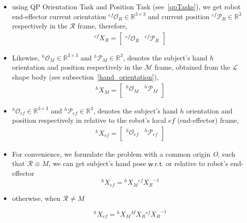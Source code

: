 \begin{itemize}
	\item using QP Orientation Task and Position Task (see~\ref{qpTasks}), we get robot end-effector current orientation ${{}^{ef}\mathcal{O}_R} \in \mathbb{R}^{3\times3}$ and current position ${{}^{ef}\mathcal{P}_R} \in \mathbb{R}^{3}$ respectively in the $\mathcal{R}$ frame, therefore,
	\begin{gather}\label{X_R_ef}
		{}^{ef}{X}_R =
		\left[\begin{array}{cc}
		{}^{ef}\mathcal{O}_R & {}^{ef}\mathcal{P}_R
		\end{array}\right]
	\end{gather}
	
	\item Likewise, ${{}^{h}\mathcal{O}_M} \in \mathbb{R}^{3\times3}$ and ${{}^{h}\mathcal{P}_M} \in \mathbb{R}^{3}$, denotes the subject's hand $h$ orientation and position respectively in the $\mathcal{M}$ frame, obtained from the $\mathcal{L}$ shape body (see subsection~\ref{hand_orientation}),
	\begin{gather}\label{X_M_h}
		{}^{h}{X}_M =
		\left[\begin{array}{cc}
		{}^{h}\mathcal{O}_M & {}^{h}\mathcal{P}_M \\
		\end{array}\right]
	\end{gather}

	\item ${{}^{h}\mathcal{O}_{ef}} \in \mathbb{R}^{3\times3}$ and ${{}^{h}\mathcal{P}_{ef}} \in \mathbb{R}^{3}$, denotes the subject's hand $h$ orientation and position respectively in relative to the robot's local $ef$ (end-effector) frame,
	\begin{gather}\label{X_ef_h}
		{}^{h}{X}_{ef} =
		\left[\begin{array}{cc}
		{}^{h}\mathcal{O}_{ef} & {}^{h}\mathcal{P}_{ef} \\
		\end{array}\right]
	\end{gather}
	
	\item For convenience, we formulate the problem with a common origin {\it O}, such that $\mathcal R \equiv M$, we can get subject's hand pose $\mathsf{w.r.t.}$ or relative to robot's end-effector
%	
	\begin{equation}\label{X_ef_h1}
		{}^{h}{X}_{ef} = {}^{h}{X}_{M}  {}^{ef}{X_{R}}^{-1}
	\end{equation}
	\item otherwise, when $\mathcal R \neq M$

	\begin{equation}\label{X_ef_h2}
	{}^{h}{X}_{ef} = {}^{h}{X}_{M}  {}^{M}{X}_R  {}^{ef}{X_{R}}^{-1}
	\end{equation}
	
\end{itemize}





